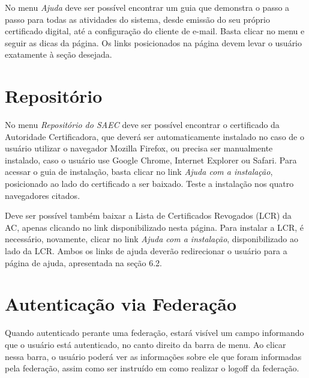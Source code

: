 No menu \textit{Ajuda} deve ser possível encontrar um guia que demonstra o passo a passo para todas as atividades do sistema, desde emissão do seu próprio certificado digital, até a configuração do cliente de e-mail. Basta clicar no menu e seguir as dicas da página. Os links posicionados na página devem levar o usuário exatamente à seção desejada.

\section{Repositório}

No menu \textit{Repositório do SAEC} deve ser possível encontrar o certificado da Autoridade Certificadora, que deverá ser automaticamente instalado no caso de o usuário utilizar o navegador Mozilla Firefox, ou precisa ser manualmente instalado, caso o usuário use Google Chrome, Internet Explorer ou Safari. Para acessar o guia de instalação, basta clicar no link \textit{Ajuda com a instalação}, posicionado ao lado do certificado a ser baixado. Teste a instalação nos quatro navegadores citados.

Deve ser possível também baixar a Lista de Certificados Revogados (LCR) da AC, apenas clicando no link disponibilizado nesta página. Para instalar a LCR, é necessário, novamente, clicar no link \textit{Ajuda com a instalação}, disponibilizado ao lado da LCR. Ambos os links de ajuda deverão redirecionar o usuário para a página de ajuda, apresentada na seção 6.2.

\section{Autenticação via Federação}

Quando autenticado perante uma federação, estará visível um campo informando que o usuário está autenticado, no canto direito da barra de menu. Ao clicar nessa barra, o usuário poderá ver as informações sobre ele que foram informadas pela federação, assim como ser instruído em como realizar o logoff da federação.